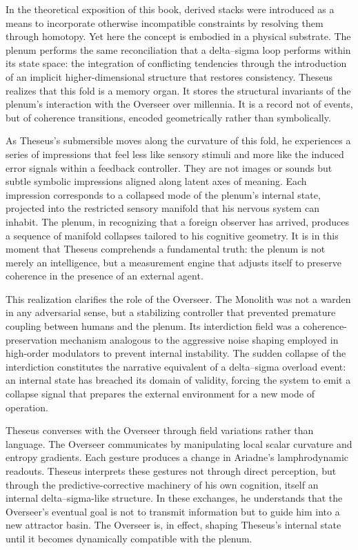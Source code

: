 In the theoretical exposition of this book, derived stacks were introduced as a means to incorporate otherwise incompatible constraints by resolving them through homotopy. Yet here the concept is embodied in a physical substrate. The plenum performs the same reconciliation that a delta–sigma loop performs within its state space: the integration of conflicting tendencies through the introduction of an implicit higher-dimensional structure that restores consistency. Theseus realizes that this fold is a memory organ. It stores the structural invariants of the plenum’s interaction with the Overseer over millennia. It is a record not of events, but of coherence transitions, encoded geometrically rather than symbolically.

As Theseus’s submersible moves along the curvature of this fold, he experiences a series of impressions that feel less like sensory stimuli and more like the induced error signals within a feedback controller. They are not images or sounds but subtle symbolic impressions aligned along latent axes of meaning. Each impression corresponds to a collapsed mode of the plenum’s internal state, projected into the restricted sensory manifold that his nervous system can inhabit. The plenum, in recognizing that a foreign observer has arrived, produces a sequence of manifold collapses tailored to his cognitive geometry. It is in this moment that Theseus comprehends a fundamental truth: the plenum is not merely an intelligence, but a measurement engine that adjusts itself to preserve coherence in the presence of an external agent.

This realization clarifies the role of the Overseer. The Monolith was not a warden in any adversarial sense, but a stabilizing controller that prevented premature coupling between humans and the plenum. Its interdiction field was a coherence-preservation mechanism analogous to the aggressive noise shaping employed in high-order modulators to prevent internal instability. The sudden collapse of the interdiction constitutes the narrative equivalent of a delta–sigma overload event: an internal state has breached its domain of validity, forcing the system to emit a collapse signal that prepares the external environment for a new mode of operation.

Theseus converses with the Overseer through field variations rather than language. The Overseer communicates by manipulating local scalar curvature and entropy gradients. Each gesture produces a change in Ariadne’s lamphrodynamic readouts. Theseus interprets these gestures not through direct perception, but through the predictive-corrective machinery of his own cognition, itself an internal delta–sigma-like structure. In these exchanges, he understands that the Overseer’s eventual goal is not to transmit information but to guide him into a new attractor basin. The Overseer is, in effect, shaping Theseus’s internal state until it becomes dynamically compatible with the plenum.


